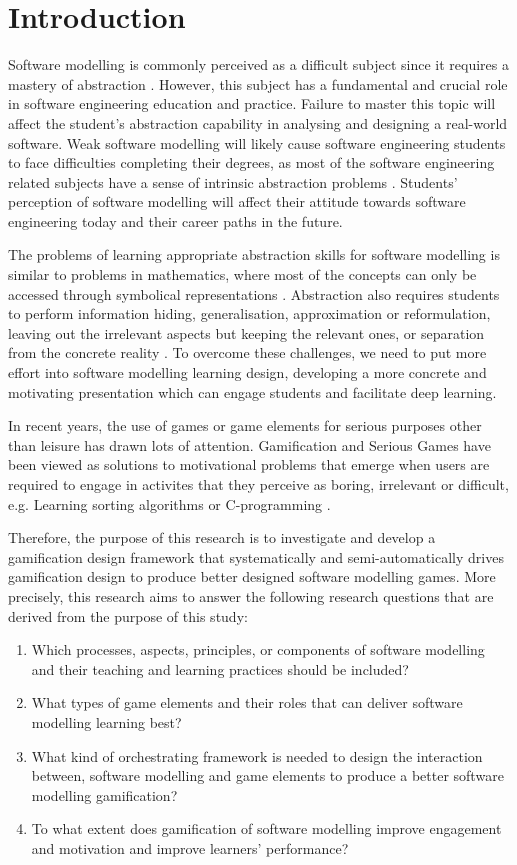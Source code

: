 \documentclass[runningheads,a4paper]{llncs}
\begin{document}
\section{Introduction}
Software modelling is commonly perceived as a difficult subject since it requires a mastery of abstraction \cite{Borstler2012}. However, this subject has a fundamental and crucial role in software engineering education and practice. Failure to master this topic will affect the student’s abstraction capability in analysing and designing a real-world software. Weak software modelling will likely cause software engineering students to face difficulties completing their degrees, as most of the software engineering related subjects have a sense of intrinsic abstraction problems \cite{Kramer2007}. Students' perception of software modelling will affect their attitude towards software engineering today and their career paths in the future.

The problems of learning appropriate abstraction skills for software modelling is similar to problems in mathematics, where most of the concepts can only be accessed through symbolical representations \cite{Duval2006}. Abstraction also requires students to perform information hiding, generalisation, approximation or reformulation, leaving out the irrelevant aspects but keeping the relevant ones, or separation from the concrete reality \cite{Saitta2013}. To overcome these challenges, we need to put more effort into software modelling learning design, developing a more concrete and motivating presentation which can engage students and facilitate deep learning.

In recent years, the use of games or game elements for serious purposes other than leisure has drawn lots of attention. Gamification \cite{deterding2011game} and Serious Games \cite{Michael2005} have been viewed as solutions to motivational problems that emerge when users are required to engage in activites that they perceive as boring, irrelevant or difficult, e.g. Learning sorting algorithms \cite{Yohannis2015} or C-programming \cite{Ibanez2014}.

Therefore, the purpose of this research is to investigate and develop a gamification design framework that systematically and semi-automatically drives gamification design to produce better designed software modelling games. More precisely, this research aims to answer the following research questions that are derived from the purpose of this study:
\begin{enumerate}
\item Which processes, aspects, principles, or components of software modelling and their teaching and learning practices should be included?
\item What types of game elements and their roles that can deliver software modelling learning best? 
\item What kind of orchestrating framework is needed to design the interaction between, software modelling and game elements to produce a better software modelling gamification?
\item To what extent does gamification of software modelling improve engagement and motivation and improve learners’ performance?
\end{enumerate}
\end{document}
